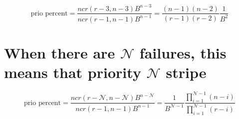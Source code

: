 \documentclass[journal]{IEEEtran}
\begin{document}
\begin{equation*}
  \text{prio percent}=\frac{ncr(r-3,n-3)B^{n-3}}{ncr(r-1,n-1)B^{n-1}}=\frac{(n-1)(n-2)}{(r-1)(r-2)}\frac{1}{B^2}
\end{equation*}

\section{When there are $\mathcal{N}$ failures, this means that priority $\mathcal{N}$ stripe}
\begin{equation*}
  \text{prio percent}=\frac{ncr(r-\mathcal{N},n-\mathcal{N})B^{n-\mathcal{N}}}{ncr(r-1,n-1)B^{n-1}}=\frac{1}{B^{\mathcal{N}-1}}\frac{\prod_{i=1}^{\mathcal{N}-1}(n-i)}{\prod_{i=1}^{\mathcal{N}-1}(r-i)}
\end{equation*}
\end{document}

